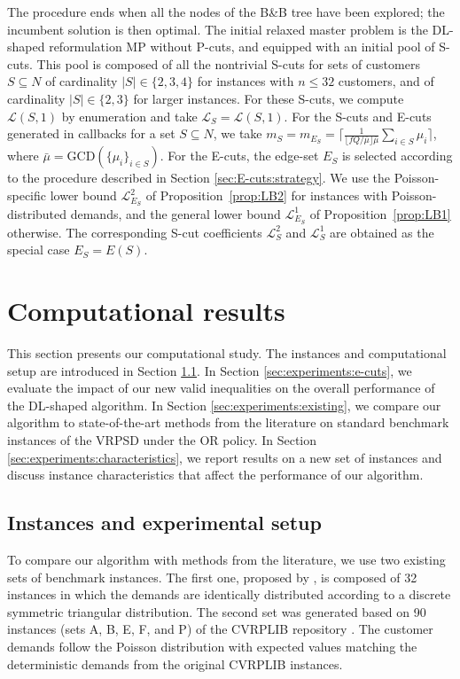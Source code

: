 \documentclass{article}
\newcommand{\rev}[1]{{\color{black}#1}}
\begin{document}
The procedure ends when all the nodes of the B\&B tree have been explored; the incumbent solution is then optimal. \rev{The initial relaxed master problem is the DL-shaped reformulation MP without P-cuts, and equipped with an initial pool of S-cuts.} This pool is composed of all the nontrivial S-cuts for sets of customers $S\subseteq N$ of cardinality $|S| \in \{2,3,4\}$ for instances with $n \leq 32$ customers, and of cardinality $|S| \in \{2,3\}$ for larger instances. For these S-cuts, we compute $\mathcal{L}(S,1)$ by enumeration and take $\mathcal{L}_S = \mathcal{L}(S,1)$. For the S-cuts and E-cuts generated in callbacks for a set $S \subseteq N$, we take $m_S = m_{E_S} = \Big\lceil \frac{1}{\lfloor fQ/\bar{\mu} \rfloor \bar{\mu}}\sum_{i \in S}\mu_i \Big\rceil$, where $\bar{\mu}=\text{GCD}(\{\mu_i\}_{i \in S})$. \rev{For the E-cuts, the edge-set $E_S$ is selected according to the procedure described in Section \ref{sec:E-cuts:strategy}. We use the Poisson-specific lower bound $\mathcal{L}^2_{E_S}$ of Proposition~\ref{prop:LB2} for instances with Poisson-distributed demands, and the general lower bound $\mathcal{L}^1_{E_S}$ of Proposition~\ref{prop:LB1} otherwise. The corresponding S-cut coefficients $\mathcal{L}^2_{S}$ and $\mathcal{L}^1_{S}$ are obtained as the special case $E_S = E(S)$.
}

\section{Computational results} \label{sec:experiments}
\rev{This section presents our computational study. The instances and computational setup are introduced in Section \ref{sec:experiments:instances}.} In Section \ref{sec:experiments:e-cuts}, we evaluate the impact of our new valid inequalities on the overall performance of the DL-shaped algorithm. In Section \ref{sec:experiments:existing}, we compare our algorithm to state-of-the-art methods from the literature on standard benchmark instances of the VRPSD under the OR policy. In Section \ref{sec:experiments:characteristics}, we report results on a new set of instances and discuss instance characteristics that affect the performance of our algorithm. 

\subsection{Instances and experimental setup} \label{sec:experiments:instances}
To compare our algorithm with methods from the literature, we use two existing sets of benchmark instances. The first one, proposed by \cite{louveaux2018exact}, is composed of 32 instances in which the demands are identically distributed according to a discrete symmetric triangular distribution. The second set was generated based on 90 instances (sets A, B, E, F, and P) of the CVRPLIB repository \cite{uchoa2017new}. The customer demands follow the Poisson distribution with expected values matching the deterministic demands from the original CVRPLIB instances.
\end{document}
